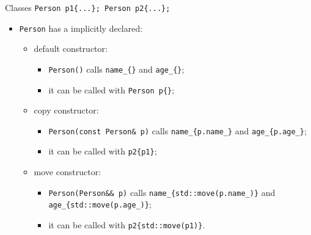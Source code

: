 \documentclass[presentation]{beamer}
\begin{document}
\begin{frame}[label={sec:org3df06de},fragile]{Classes}
 \texttt{Person p1\{...\}; Person p2\{...\};}
\begin{itemize}
\item \texttt{Person} has a implicitly declared:
\begin{itemize}
\item default constructor:
\begin{itemize}
\item \texttt{Person()} calls \texttt{name\_\{\}} and \texttt{age\_\{\}};
\item it can be called with \texttt{Person p\{\}};
\end{itemize}
\item copy constructor:
\begin{itemize}
\item \texttt{Person(const Person\& p)} calls \texttt{name\_\{p.name\_\}} and
\texttt{age\_\{p.age\_\}};
\item it can be called with \texttt{p2\{p1\}};
\end{itemize}
\item move constructor:
\begin{itemize}
\item \texttt{Person(Person\&\& p)} calls \texttt{name\_\{std::move(p.name\_)\}} and
\texttt{age\_\{std::move(p.age\_)\}};
\item it can be called with \texttt{p2\{std::move(p1)\}}.
\end{itemize}
\end{itemize}
\end{itemize}
\end{frame}
\end{document}
